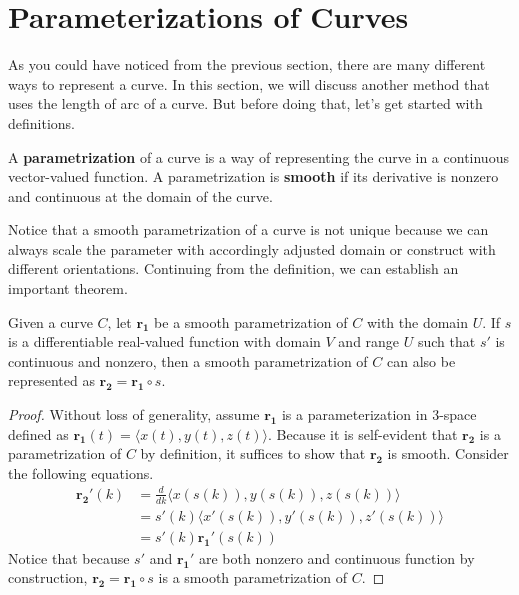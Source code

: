 \documentclass[../../../main.tex]{subfiles}
\begin{document}
\section{Parameterizations of Curves}

As you could have noticed from the previous section, there are
many different ways to represent a curve. In this section,
we will discuss another method that uses the length of arc of
a curve. But before doing that, let's get started with definitions.

\begin{definition}{}{}
A \textbf{parametrization} of a curve is a way of representing the
curve in a continuous vector-valued function. A parametrization is
\textbf{smooth} if its derivative is nonzero and continuous at the
domain of the curve.
\end{definition}

Notice that a smooth parametrization of a curve is not unique
because we can always scale the parameter with accordingly adjusted
domain or construct with different orientations. Continuing from
the definition, we can establish an important theorem.

\begin{theorem}{}{}
Given a curve $C$, let $\mathbf{r_1}$ be a smooth parametrization of
$C$ with the domain $U$. If $s$ is a differentiable real-valued
function with domain $V$ and range $U$ such that $s'$ is continuous
and nonzero, then a smooth parametrization of $C$ can also be
represented as $\mathbf{r_2} = \mathbf{r_1} \circ s$.
\end{theorem}
\begin{proof}
Without loss of generality, assume $\mathbf{r_1}$ is a
parameterization in 3-space defined as $\mathbf{r_1}(t) =
\langle x(t), y(t), z(t) \rangle$. Because it is self-evident that
$\mathbf{r_2}$ is a parametrization of $C$ by definition, it suffices
to show that $\mathbf{r_2}$ is smooth. Consider the following
equations.
\begin{align*}
    \mathbf{r_2}'(k)
    &= \frac{d}{dk} \langle x(s(k)), y(s(k)), z(s(k)) \rangle \\
    &= s'(k) \langle x'(s(k)), y'(s(k)), z'(s(k)) \rangle \\
    &= s'(k) \mathbf{r_1}'(s(k))
\end{align*}
Notice that because $s'$ and $\mathbf{r_1}'$ are both nonzero and
continuous function by construction, $\mathbf{r_2} = \mathbf{r_1}
\circ s$ is a smooth parametrization of $C$.
\end{proof}
\end{document}
